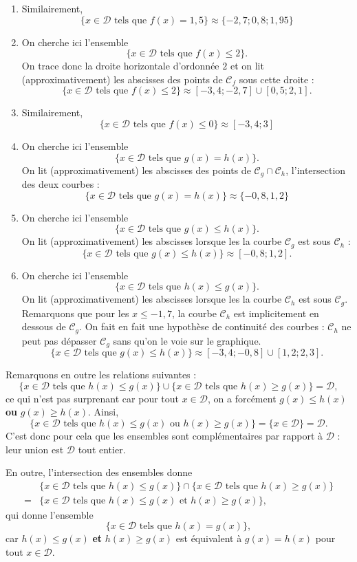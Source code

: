 \documentclass[a4paper, 14pt]{extarticle}
\theoremstyle{plain}
\theoremstyle{definition}
\newcommand{\C}{\mathcal{C}}
\newcommand{\D}{\mathcal{D}}
\begin{document}
{\begin{enumerate}
			\item Similairement,
				\[ \{ x \in \D \text{ tels que } f(x) = 1,5 \} \approx \{ {-2,7}; {0,8} ; {1,95} \} \]
				
			\item On cherche ici l'ensemble
				\[ \{ x \in \D \text{ tels que } f(x) \leq 2 \}. \]
			On trace donc la droite horizontale d'ordonnée $2$ et on lit (approximativement) les abscisses des points de $\C_f$ sous cette droite : 
				\[ \{ x \in \D \text{ tels que } f(x) \leq 2 \} \approx [{-3,4} ; {-2,7} ] \cup [ {0,5} ; {2,1} ].  \]
			\item Similairement,
				\[ \{ x \in \D \text{ tels que } f(x) \leq 0 \} \approx [{-3,4} ; {3} ]  \]
			\item On cherche ici l'ensemble
				\[ \{ x \in \D \text{ tels que } g(x) = h(x) \}. \]
			On lit (approximativement) les abscisses des points de $\C_g \cap \C_h$, l'intersection des deux courbes :
				\[ \{ x \in \D \text{ tels que } g(x) = h(x) \} \approx \{ {-0,8}, {1,2} \} \]
			\item On cherche ici l'ensemble
				\[ \{ x \in \D \text{ tels que } g(x) \leq h(x) \}. \]
			On lit (approximativement) les abscisses lorsque les la courbe $\C_g$ est sous $\C_h$ :
				\[ \{ x \in \D \text{ tels que } g(x) \leq h(x) \} \approx [ {-0,8} ; {1,2} ]. \]
			\item On cherche ici l'ensemble
				\[ \{ x \in \D \text{ tels que } h(x) \leq g(x) \}. \]
			On lit (approximativement) les abscisses lorsque les la courbe $\C_h$ est sous $\C_g$.
			Remarquons que pour les $x\leq-1,7$, la courbe $\C_h$ est implicitement en dessous de $\C_g$.
			On fait en fait une hypothèse de continuité des courbes : $\C_h$ ne peut pas dépasser $\C_g$ sans qu'on le voie sur le graphique.
				\[ \{ x \in \D \text{ tels que } g(x) \leq h(x) \} \approx [{-3,4} ; {-0,8} ] \cup [ {1,2} ; {2,3} ]. \]
		\end{enumerate}
		
		Remarquons en outre les relations suivantes :
			\[ \{ x \in \D \text{ tels que } h(x) \leq g(x) \} \cup \{ x \in \D \text{ tels que } h(x) \geq g(x) \} = \D, \]
		ce qui n'est pas  surprenant car pour tout $x\in\D$, on a forcément $g(x) \leq h(x)$ \textbf{ou} $g(x) \geq h(x)$. 
		Ainsi, 
			\[ \{ x \in \D \text{ tels que } h(x) \leq g(x) \text{ ou }  h(x) \geq g(x) \}  = \{ x \in \D \} = \D. \]
		C'est donc pour cela que les ensembles sont complémentaires par rapport à $\D$ : leur union est $\D$ tout entier.
		
		En outre, l'intersection des ensembles donne
			\begin{align*}
			 & \{ x \in \D \text{ tels que } h(x) \leq g(x) \} \cap \{ x \in \D \text{ tels que } h(x) \geq g(x) \} \\
			 =& \{ x \in \D \text{ tels que } h(x) \leq g(x) \text{ et } h(x) \geq g(x) \},
			 \end{align*}
		qui donne l'ensemble
			\[ \{ x \in \D \text{ tels que } h(x) = g(x) \}, \]
		car $h(x) \leq g(x)$ \textbf{et} $h(x) \geq g(x)$ est équivalent à $g(x) = h(x)$ pour tout $x\in\D$.
		
}
\end{document}
